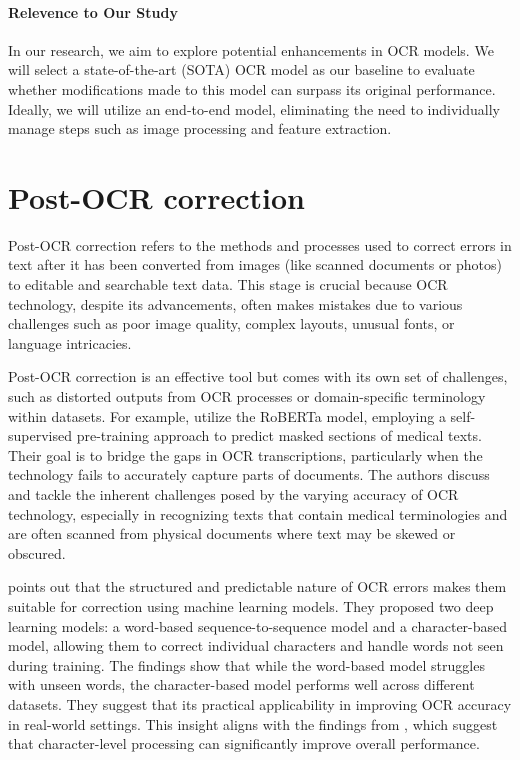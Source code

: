 \paragraph*{Relevence to Our Study}
In our research, we aim to explore potential enhancements in OCR models. We will select a state-of-the-art (SOTA) OCR model as our baseline to evaluate whether modifications made to this model can surpass its original performance. Ideally, we will utilize an end-to-end model, eliminating the need to individually manage steps such as image processing and feature extraction.

\section{Post-OCR correction}
\label{sec:2_post-ocr_correction}
Post-OCR correction refers to the methods and processes used to correct errors in text after it has been converted from images (like scanned documents or photos) to editable and searchable text data. This stage is crucial because OCR technology, despite its advancements, often makes mistakes due to various challenges such as poor image quality, complex layouts, unusual fonts, or language intricacies.

Post-OCR correction is an effective tool but comes with its own set of challenges, such as distorted outputs from OCR processes or domain-specific terminology within datasets. For example, \cite{karthikeyan2021ocr} utilize the RoBERTa model, employing a self-supervised pre-training approach to predict masked sections of medical texts. Their goal is to bridge the gaps in OCR transcriptions, particularly when the technology fails to accurately capture parts of documents. The authors discuss and tackle the inherent challenges posed by the varying accuracy of OCR technology, especially in recognizing texts that contain medical terminologies and are often scanned from physical documents where text may be skewed or obscured.

\cite{mokhtar2018ocr} points out that the structured and predictable nature of OCR errors makes them suitable for correction using machine learning models. They proposed two deep learning models: a word-based sequence-to-sequence model and a character-based model, allowing them to correct individual characters and handle words not seen during training. The findings show that while the word-based model struggles with unseen words, the character-based model performs well across different datasets. They suggest that its practical applicability in improving OCR accuracy in real-world settings. This insight aligns with the findings from \cite{kang2021candidate}, which suggest that character-level processing can significantly improve overall performance.

